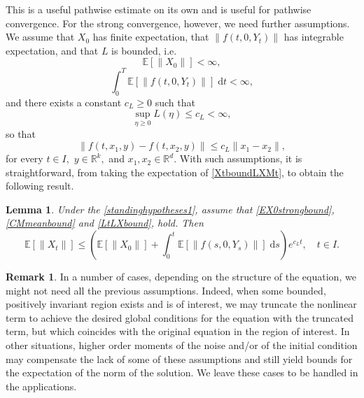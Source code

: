 \documentclass[reqno,12pt]{amsart}
\theoremstyle{plain} %
\newtheorem{lemma}{Lemma}[section]
\theoremstyle{definition} %
\newtheorem{remark}{Remark}[section]
\begin{document}
This is a useful pathwise estimate on its own and is useful for pathwise convergence. For the strong convergence, however, we need further assumptions. We assume that $X_0$ has finite expectation, that $\|f(t, 0, Y_t)\|$ has integrable expectation, and that $L$ is bounded, i.e.
\begin{equation}
    \label{EX0strongbound}
    \mathbb{E}[\|X_0\|] < \infty,
\end{equation}
\begin{equation}
    \label{CMmeanbound}
    \int_0^T \mathbb{E}\left[\|f(t, 0, Y_t)\|\right] \;\mathrm{d}t < \infty,
\end{equation}
and there exists a constant $c_L \geq 0$ such that
\begin{equation}
    \label{LtLXbound}
    \sup_{\eta \geq 0} L(\eta) \leq c_L < \infty,
\end{equation}
so that
\begin{equation}
    \|f(t, x_1, y) - f(t, x_2, y)\| \leq c_L \|x_1 - x_2\|,
\end{equation}
for every $t\in I,$ $y\in\mathbb{R}^k,$ and $x_1, x_2 \in\mathbb{R}^d.$ With such assumptions, it is straightforward, from taking the expectation of \cref{XtboundLXMt}, to obtain the following result.

\begin{lemma}
    \label{lemstrongbound}
    Under the \cref{standinghypotheses1}, assume that \cref{EX0strongbound}, \cref{CMmeanbound} and \cref{LtLXbound},   hold. Then
    \begin{equation}
        \label{EXtstrongbound}
        \mathbb{E}[\|X_t\|] \leq \left(\mathbb{E}[\|X_0\|] + \int_0^t \mathbb{E}[\|f(s, 0, Y_s)\|]\;\mathrm{d}s\right) e^{c_L t}, \quad t\in I.
    \end{equation}
\end{lemma}

\begin{remark}
    In a number of cases, depending on the structure of the equation, we might not need all the previous assumptions. Indeed, when some bounded, positively invariant region exists and is of interest, we may truncate the nonlinear term to achieve the desired global conditions for the equation with the truncated term, but which coincides with the original equation in the region of interest. In other situations, higher order moments of the noise and/or of the initial condition may compensate the lack of some of these assumptions and still yield bounds for the expectation of the norm of the solution. We leave these cases to be handled in the applications.
\end{remark}
\end{document}
